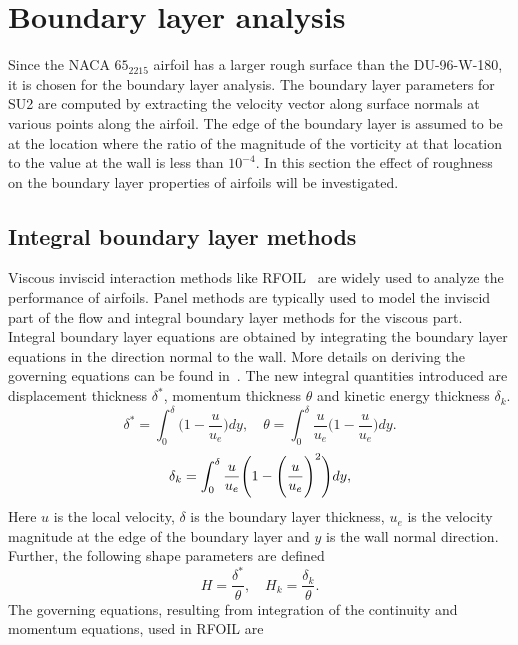 \section{Boundary layer analysis}\label{sec:blanalysis}
Since the NACA $65_2215$ airfoil has a larger rough surface than the DU-96-W-180, it is chosen for the boundary layer analysis. The boundary layer parameters for SU2  are computed by extracting the velocity vector along surface normals at various points along the airfoil. The edge of the boundary layer is assumed to be at the location where the ratio of the magnitude of the vorticity at that location to the value at the wall is less than $10^{-4}$. In this section the effect of roughness on the boundary layer properties of airfoils will be investigated.
\subsection{Integral boundary layer methods}
\noindent Viscous inviscid interaction methods like RFOIL~\cite{rfoil_orig} are widely used to analyze the performance of airfoils. Panel methods are typically used to model the inviscid part of the flow and integral boundary layer methods for the viscous part. Integral boundary layer equations are obtained by integrating the boundary layer equations in the direction normal to the wall. More details on deriving the governing equations can be found in~\cite{drela1986two, Ozdemir2020}. 
The new integral quantities introduced are displacement thickness $\delta^*$, momentum thickness $\theta$ and kinetic energy thickness $\delta_k$. 
\begin{equation*}
\delta^* = \int_0^{\delta}\Bigg(1-\frac{u}{u_e}\Bigg)dy, \quad
\theta = \int_0^{\delta}\frac{u}{u_e}\Bigg(1-\frac{u}{u_e}\Bigg)dy.
\end{equation*}
\begin{equation}
\centering
\delta_k = \int_0^{\delta}\frac{u}{u_e}\Bigg(1-\Bigg(\frac{u}{u_e}\Bigg)^2\Bigg)dy, 
\end{equation}
Here $u$ is the local velocity, $\delta$ is the boundary layer thickness, $u_e$ is the velocity magnitude at the edge of the boundary layer and $y$ is the wall normal direction. Further, the following shape parameters are defined 
\begin{equation}
H = \frac{\delta^*}{\theta}, \quad H_k = \frac{\delta_k}{\theta}.
\label{eq:Hstar}
\end{equation}
The governing equations, resulting from integration of the continuity and momentum equations, used in RFOIL are
